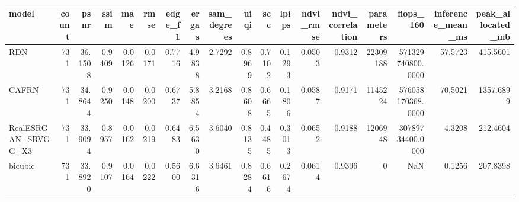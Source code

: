 \begin{tabular}{lrrrrrrrrrrrrrrrrr}
\toprule
model & count & psnr & ssim & mae & rmse & edge_f1 & ergas & sam_degrees & uiqi & scc & lpips & ndvi_rmse & ndvi_correlation & parameters & flops_160 & inference_mean_ms & peak_allocated_mb \\
\midrule
RDN & 731 & 36.1508 & 0.9409 & 0.0126 & 0.0171 & 0.7716 & 4.9838 & 2.7292 & 0.8969 & 0.7102 & 0.1293 & 0.0503 & 0.9312 & 22309188 & 571329740800.0000 & 57.5723 & 415.5601 \\
CAFRN & 731 & 34.8644 & 0.9250 & 0.0148 & 0.0200 & 0.6737 & 5.8854 & 3.2168 & 0.8608 & 0.6665 & 0.1806 & 0.0587 & 0.9171 & 1145224 & 576058170368.0000 & 70.5021 & 1357.6899 \\
RealESRGAN_SRVGG_X3 & 731 & 33.9094 & 0.8957 & 0.0162 & 0.0219 & 0.6483 & 6.5630 & 3.6040 & 0.8135 & 0.4485 & 0.3013 & 0.0652 & 0.9188 & 1206948 & 30789734400.0000 & 4.3208 & 212.4604 \\
bicubic & 731 & 33.8920 & 0.9107 & 0.0164 & 0.0222 & 0.5600 & 6.6316 & 3.6461 & 0.8284 & 0.6616 & 0.2674 & 0.0614 & 0.9396 & 0 & NaN & 0.1256 & 207.8398 \\
\bottomrule
\end{tabular}
